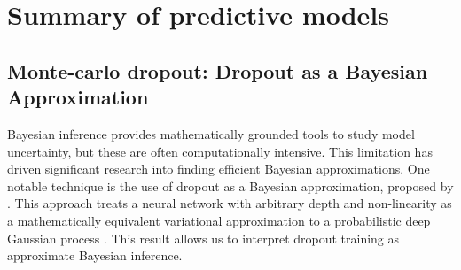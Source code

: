 \section{Summary of predictive models}\label{sec:pred_models}

\subsection{Monte-carlo dropout: Dropout as a Bayesian Approximation}
\label{sec:DropoutApprox}

Bayesian inference provides mathematically grounded tools to study model uncertainty, but these are often computationally intensive. This limitation has driven significant research into finding efficient Bayesian approximations. One notable technique is the use of dropout as a Bayesian approximation, proposed by \cite{Gal2016}. This approach treats a neural network with arbitrary depth and non-linearity as a mathematically equivalent variational approximation to a probabilistic deep Gaussian process \cite{pmlr-v31-damianou13a}. This result allows us to interpret dropout training as approximate Bayesian inference.


